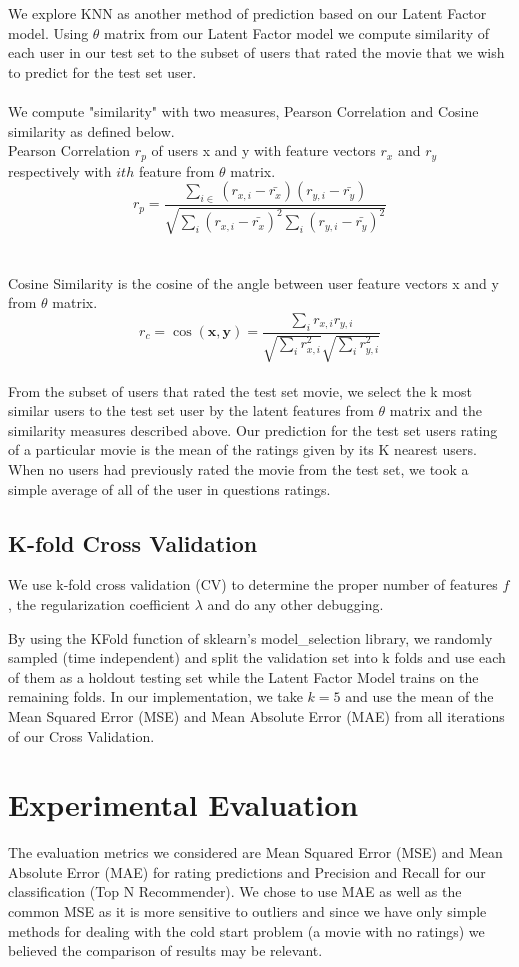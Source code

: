 \documentclass[12pt]{article}
\begin{document}
We explore KNN as another method of prediction based on our Latent Factor model. Using $\theta$ matrix from our Latent Factor model we compute similarity of each user in our test set to the subset of users that rated the movie that we wish to predict for the test set user.  
\\ \\
We compute "similarity" with two measures, Pearson Correlation and Cosine similarity as defined below.
\\
Pearson Correlation $r_{p}$ of users x and y with feature vectors $r_{x}$ and $r_{y}$ respectively with $ith$ feature from $\theta$ matrix.  
$$r_{p} = \dfrac{ \sum_{i\in} (r_{x,i} - \bar{r_{x}})(r_{y,i} - \bar{r_{y}})}{\sqrt{\sum_{i} (r_{x,i} - \bar{r_{x}})^{2} \sum_{i} (r_{y,i} - \bar{r_{y}})^{2}}}$$ 
\\ \\
Cosine Similarity is the cosine of the angle between user feature vectors x and y from $\theta$ matrix.
$$r_{c} = \cos(\textbf{x},\textbf{y}) = \frac{\sum_{i} r_{x,i} r_{y,i} }{\sqrt{\sum_{i} r_{x,i}^2} \sqrt{\sum_{i} r_{y,i}^2}} $$
\\
From the subset of users that rated the test set movie, we select the k most similar users to the test set user by the latent features from $\theta$ matrix and the similarity measures described above. Our prediction for the test set users rating of a particular movie is the mean of the ratings given by its K nearest users. When no users had previously rated the movie from the test set, we took a simple average of all of the user in questions ratings. 

\subsection{K-fold Cross Validation}
We use k-fold cross validation (CV) to determine the proper number of features $f$, the regularization coefficient $\lambda$ and do any other debugging.

By using the KFold function of sklearn's model\_selection library, we randomly sampled (time independent) and split the validation set into k folds and use each of them as a holdout testing set while the Latent Factor Model trains on the remaining folds. In our implementation, we take $k=5$ and use the mean of the Mean Squared Error (MSE) and Mean Absolute Error (MAE) from all iterations of our Cross Validation.

\section{Experimental Evaluation}
The evaluation metrics we considered are Mean Squared Error (MSE) and Mean Absolute Error (MAE) for rating predictions and Precision and Recall for our classification (Top N Recommender). We chose to use MAE as well as the common MSE as it is more sensitive to outliers and since we have only simple methods for dealing with the cold start problem (a movie with no ratings) we believed the comparison of results may be relevant.
\end{document}
